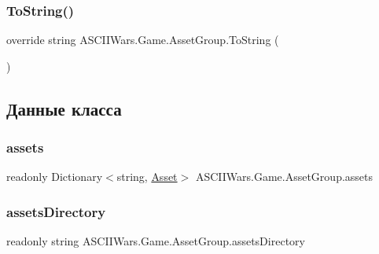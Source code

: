 \subsubsection{\texorpdfstring{To\+String()}{ToString()}}
{\footnotesize\ttfamily override string A\+S\+C\+I\+I\+Wars.\+Game.\+Asset\+Group.\+To\+String (\begin{DoxyParamCaption}{ }\end{DoxyParamCaption})\hspace{0.3cm}{\ttfamily [inline]}}



\subsection{Данные класса}
\hypertarget{class_a_s_c_i_i_wars_1_1_game_1_1_asset_group_ae2481944ac1b6ebe0f4e383ef7de141c}{}\label{class_a_s_c_i_i_wars_1_1_game_1_1_asset_group_ae2481944ac1b6ebe0f4e383ef7de141c} 
\subsubsection{\texorpdfstring{assets}{assets}}
{\footnotesize\ttfamily readonly Dictionary$<$string, \hyperlink{class_a_s_c_i_i_wars_1_1_game_1_1_asset}{Asset}$>$ A\+S\+C\+I\+I\+Wars.\+Game.\+Asset\+Group.\+assets}

\hypertarget{class_a_s_c_i_i_wars_1_1_game_1_1_asset_group_a6c7083ec7602a32f4e99601ef5d54397}{}\label{class_a_s_c_i_i_wars_1_1_game_1_1_asset_group_a6c7083ec7602a32f4e99601ef5d54397} 
\subsubsection{\texorpdfstring{assets\+Directory}{assetsDirectory}}
{\footnotesize\ttfamily readonly string A\+S\+C\+I\+I\+Wars.\+Game.\+Asset\+Group.\+assets\+Directory}

\hypertarget{class_a_s_c_i_i_wars_1_1_game_1_1_asset_group_aeb6e4bd616bf065ce4a04f5c34e9c3d9}{}\label{class_a_s_c_i_i_wars_1_1_game_1_1_asset_group_aeb6e4bd616bf065ce4a04f5c34e9c3d9} 
